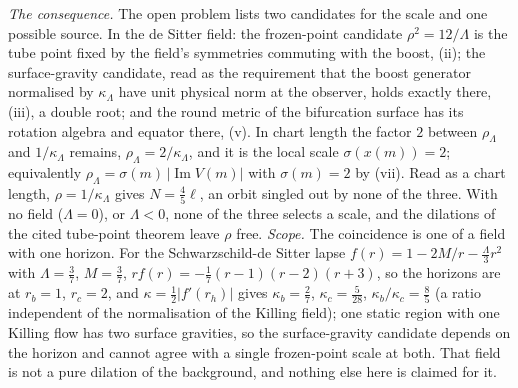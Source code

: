 \emph{The consequence.} The open problem lists two candidates for the scale and one possible source. In the de Sitter field: the frozen-point candidate $\rho^{2} = 12/\Lambda$ is the tube point fixed by the field's symmetries commuting with the boost, (ii); the surface-gravity candidate, read as the requirement that the boost generator normalised by $\kappa_{\Lambda}$ have unit physical norm at the observer, holds exactly there, (iii), a double root; and the round metric of the bifurcation surface has its rotation algebra and equator there, (v). In chart length the factor $2$ between $\rho_{\Lambda}$ and $1/\kappa_{\Lambda}$ remains, $\rho_{\Lambda} = 2/\kappa_{\Lambda}$, and it is the local scale $\sigma(x(m)) = 2$; equivalently $\rho_{\Lambda} = \sigma(m)\,|\operatorname{Im}V(m)|$ with $\sigma(m) = 2$ by (vii). Read as a chart length, $\rho = 1/\kappa_{\Lambda}$ gives $N = \tfrac45\ell$, an orbit singled out by none of the three. With no field ($\Lambda = 0$), or $\Lambda < 0$, none of the three selects a scale, and the dilations of the cited tube-point theorem leave $\rho$ free. \emph{Scope.} The coincidence is one of a field with one horizon. For the Schwarzschild-de Sitter lapse $f(r) = 1 - 2M/r - \tfrac{\Lambda}{3}r^{2}$ with $\Lambda = \tfrac37$, $M = \tfrac37$, $rf(r) = -\tfrac17(r - 1)(r - 2)(r + 3)$, so the horizons are at $r_{b} = 1$, $r_{c} = 2$, and $\kappa = \tfrac12|f'(r_{h})|$ gives $\kappa_{b} = \tfrac27$, $\kappa_{c} = \tfrac{5}{28}$, $\kappa_{b}/\kappa_{c} = \tfrac85$ (a ratio independent of the normalisation of the Killing field); one static region with one Killing flow has two surface gravities, so the surface-gravity candidate depends on the horizon and cannot agree with a single frozen-point scale at both. That field is not a pure dilation of the background, and nothing else here is claimed for it.

